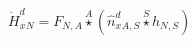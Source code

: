 \documentclass[border=2pt]{standalone}
\begin{document}
${{\dot{H}^d_x}}{_{N}}={{F}}{_{N, A}} \stackrel{A}{\star} \left({{\hat{n}^{d}_x}}{_{A, S}} \stackrel{S}{\star} {h}{_{N, S}}\right)$
\end{document}
